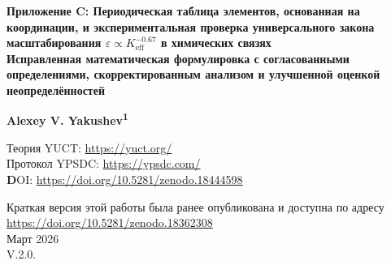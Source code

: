 \documentclass[12pt,a4paper]{article}
\theoremstyle{remark}
\newcommand{\Keff}{K_{\mathrm{eff}}}
\begin{document}
	
	\begin{titlepage}
		\begin{center}
			\vspace*{1cm}
			
			\Huge\textbf{Приложение C: Периодическая таблица элементов, основанная на координации, и экспериментальная проверка универсального закона масштабирования $\varepsilon \propto \Keff^{-0.67}$ в химических связях} \\
			\vspace{0.5cm}
			\Large\textbf{Исправленная математическая формулировка с согласованными определениями, скорректированным анализом и улучшенной оценкой неопределённостей}
			
			\vspace{1.5cm}
			
			\Large\textbf{Alexey V. Yakushev\textsuperscript{1}}
			
			Теория YUCT: \url{https://yuct.org/}\\
			Протокол YPSDC: \url{https://ypsdc.com/}\\
			
			\vspace{2cm}
			\textbf DOI: \url{https://doi.org/10.5281/zenodo.18444598}\\
			
			\vspace{1cm}
			
			\vspace{0cm}
			\large 
			Краткая версия этой работы была ранее опубликована и доступна по адресу\\ \url{https://doi.org/10.5281/zenodo.18362308}\\
			\vspace{1cm}
			Март 2026 \\ \large V.2.0.
			
			\vspace{2cm}
			

\end{center}
\end{titlepage}
\end{document}
